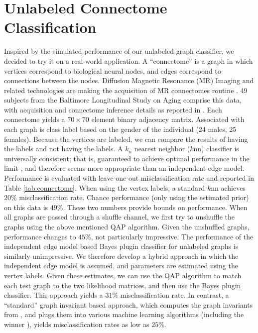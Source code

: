 \documentclass[10pt,journal,cspaper,compsoc]{IEEEtran}
\begin{document}


\section{Unlabeled Connectome Classification} %
\label{sub:connectome_classification}

Inspired by the simulated performance of our unlabeled graph classifier, we decided to try it on a real-world application.  A ``connectome'' is a graph in which vertices correspond to biological neural nodes, and edges correspond to connections between the nodes.  Diffusion Magnetic Resonance (MR) Imaging and related technologies are making the acquisition of MR connectomes routine \cite{Hagmann2010}.  49 subjects from the Baltimore Longitudinal Study on Aging comprise this data, with acquisition and connectome inference details as reported in \cite{Gray11}.  Each connectome yields a $70 \times 70$ element binary adjacency matrix.  Associated with each graph is class label based on the gender of the individual (24 males, 25 females).  Because the vertices are labeled, we can compare the results of having the labels and not having the labels.  A $k_n$ nearest neighbor ($k$nn) classifier is universally consistent; that is, guaranteed to achieve optimal performance in the limit \cite{Stone1977}, and therefore seems more appropriate than an independent edge model.  Performance is evaluated with leave-one-out misclassification rate and reported in Table \ref{tab:connectome}. When using the vertex labels, a standard $k$nn achieves $20\%$ misclassification rate.  Chance performance (only using the estimated prior) on this data is $49\%$.  These two numbers provide bounds on performance.  When all graphs are passed through a shuffle channel, we first try to unshuffle the graphs using the above mentioned QAP algorithm.  Given the unshuffled graphs, performance changes to $45\%$, not particularly impressive.  The performance of the independent edge model based Bayes plugin classifier for unlabeled graphs is similarly unimpressive.  We therefore develop a hybrid approach in which the independent edge model is assumed, and parameters are estimated using the vertex labels.  Given these estimates, we can use the QAP algorithm to match each test graph to the two likelihood matrices, and then use the Bayes plugin classifier.  This approach yields a $31\%$ misclassification rate. In contrast, a ``standard'' graph invariant based approach, which computes the graph invariants from \cite{PCP10}, and plugs them into various machine learning algorithms (including the winner \cite{Crammer2008}), yields misclassification rates as low as $25\%$. 
\end{document}
